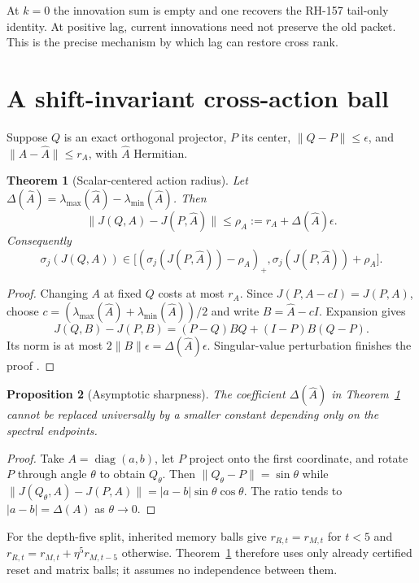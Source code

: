 \documentclass[12pt]{article}
\newtheorem{theorem}{Theorem}
\newtheorem{proposition}[theorem]{Proposition}
\begin{document}
At $k=0$ the innovation sum is empty and one recovers the RH-157 tail-only
identity.  At positive lag, current innovations need not preserve the old
packet.  This is the precise mechanism by which lag can restore cross rank.

\section{A shift-invariant cross-action ball}
Suppose $Q$ is an exact orthogonal projector, $P$ its center,
$\|Q-P\|\leq\epsilon$, and $\|A-\widehat A\|\leq r_A$, with $\widehat A$
Hermitian.

\begin{theorem}[Scalar-centered action radius]\label{thm:center}
Let $\Delta(\widehat A)=\lambda_{\max}(\widehat A)-
\lambda_{\min}(\widehat A)$.  Then
\[
 \|J(Q,A)-J(P,\widehat A)\|
 \leq \rho_A:=r_A+\Delta(\widehat A)\epsilon.
\]
Consequently
\[
 \sigma_j(J(Q,A))\in
 \bigl[(\sigma_j(J(P,\widehat A))-\rho_A)_+,
       \sigma_j(J(P,\widehat A))+\rho_A\bigr].
\]
\end{theorem}
\begin{proof}
Changing $A$ at fixed $Q$ costs at most $r_A$.  Since
$J(P,A-cI)=J(P,A)$, choose
$c=(\lambda_{\max}(\widehat A)+\lambda_{\min}(\widehat A))/2$ and write
$B=\widehat A-cI$.  Expansion gives
\[
 J(Q,B)-J(P,B)=(P-Q)BQ+(I-P)B(Q-P).
\]
Its norm is at most $2\|B\|\epsilon=\Delta(\widehat A)\epsilon$.
Singular-value perturbation finishes the proof
\citep{Bhatia1997,StewartSun1990}.
\end{proof}

\begin{proposition}[Asymptotic sharpness]\label{prop:sharp}
The coefficient $\Delta(\widehat A)$ in Theorem~\ref{thm:center} cannot be
replaced universally by a smaller constant depending only on the spectral
endpoints.
\end{proposition}
\begin{proof}
Take $A=\operatorname{diag}(a,b)$, let $P$ project onto the first coordinate,
and rotate $P$ through angle $\theta$ to obtain $Q_\theta$.  Then
$\|Q_\theta-P\|=\sin\theta$ while
$\|J(Q_\theta,A)-J(P,A)\|=|a-b|\sin\theta\cos\theta$.
The ratio tends to $|a-b|=\Delta(A)$ as $\theta\to0$.
\end{proof}

For the depth-five split, inherited memory balls give
$r_{R,t}=r_{M,t}$ for $t<5$ and
$r_{R,t}=r_{M,t}+\eta^5r_{M,t-5}$ otherwise.  Theorem~\ref{thm:center}
therefore uses only already certified reset and matrix balls; it assumes no
independence between them.
\end{document}
